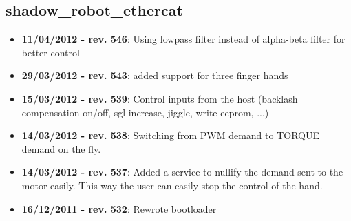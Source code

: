
\subsection{shadow\_robot\_ethercat}
\label{sec:shadow-robot-ethercat-changelog}

\begin{itemize}
\item \textbf{11/04/2012 - rev. 546}: Using lowpass filter instead of alpha-beta filter for better control
\item \textbf{29/03/2012 - rev. 543}: added support for three finger hands
\item \textbf{15/03/2012 - rev. 539}: Control inputs from the host (backlash compensation on/off, sgl increase, jiggle, write eeprom, ...)
\item \textbf{14/03/2012 - rev. 538}: Switching from PWM demand to TORQUE demand on the fly.
\item \textbf{14/03/2012 - rev. 537}: Added a service to nullify the demand sent to the motor easily. This way the user can easily stop the control of the hand.
\item \textbf{16/12/2011 - rev. 532}: Rewrote bootloader
\end{itemize}